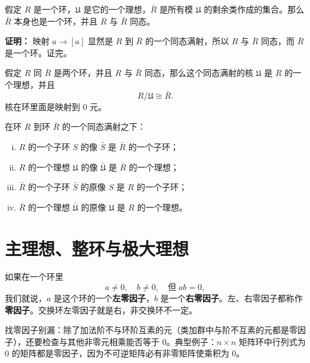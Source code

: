 \begin{theorem}
假定 $R$ 是一个环，$\mathfrak{U}$ 是它的一个理想，$\bar{R}$ 是所有模 $\mathfrak{U}$ 的剩余类作成的集合。那么 $\bar{R}$ 本身也是一个环，并且 $R$ 与 $\bar{R}$ 同态。

\textbf{证明：} 映射 $a\longrightarrow[a]$ 显然是 $R$ 到 $\bar{R}$ 的一个同态满射，所以 $R$ 与 $\bar{R}$ 同态，而 $\bar{R}$ 是一个环。证完。
\end{theorem}

\begin{theorem}
假定 $R$ 同 $\bar{R}$ 是两个环，并且 $R$ 与 $\bar{R}$ 同态，那么这个同态满射的核 $\mathfrak{U}$ 是 $R$ 的一个理想，并且
\[
R/\mathfrak{U}\cong\bar{R}.
\]
核在环里面是映射到 $0$ 元。
\end{theorem}

\begin{theorem}[定理 3：$R$ 和 $R$ 的商环同态满射的性质，传递]
在环 $R$ 到环 $\bar{R}$ 的一个同态满射之下：
\begin{enumerate}[(i)]
  \item $R$ 的一个子环 $S$ 的像 $\bar{S}$ 是 $\bar{R}$ 的一个子环；
  \item $R$ 的一个理想 $\mathfrak{U}$ 的像 $\bar{\mathfrak{U}}$ 是 $\bar{R}$ 的一个理想；
  \item $\bar{R}$ 的一个子环 $\bar{S}$ 的原像 $S$ 是 $R$ 的一个子环；
  \item $\bar{R}$ 的一个理想 $\bar{\mathfrak{U}}$ 的原像 $\mathfrak{U}$ 是 $R$ 的一个理想。
\end{enumerate}
\end{theorem}

\section{主理想、整环与极大理想}

\begin{definition}
如果在一个环里
\[
a\ne 0,\quad b\ne 0,\quad\text{但}\;ab=0,
\]
我们就说，$a$ 是这个环的一个\textbf{左零因子}，$b$ 是一个\textbf{右零因子}。左、右零因子都称作\textbf{零因子}。交换环左零因子就是右，非交换环不一定。
\end{definition}

\begin{note}[寻找零因子的要点]
找零因子别漏：除了加法阶不与环阶互素的元（类加群中与阶不互素的元都是零因子），还要检查与其他非零元相乘能否等于 $0$。典型例子：$n\times n$ 矩阵环中行列式为 $0$ 的矩阵都是零因子，因为不可逆矩阵必有非零矩阵使乘积为 $0$。
\end{note}

